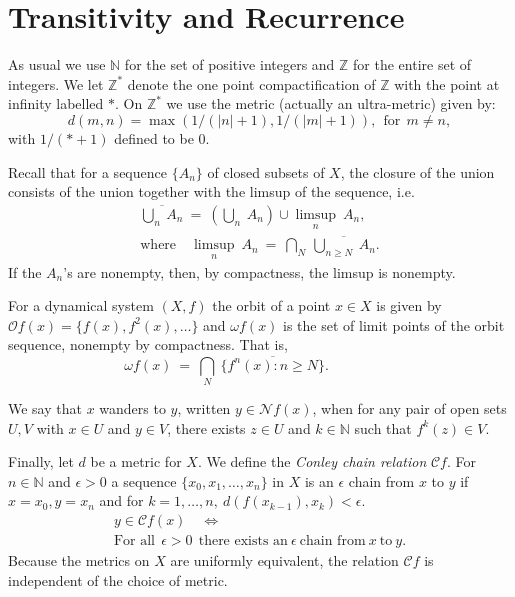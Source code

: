 \documentclass[12pt]{amsart}
\def \ol {\overline}
\def \N {\mathbb N}
\def \Z {\mathbb Z}
\def \CC {\mathcal C}
\def \NN {\mathcal N}
\def \O {\mathcal O}
\def \ep {\epsilon}
\def \om {\omega}
\numberwithin{equation}{section}
\begin{document}
\section{ \textbf{Transitivity and Recurrence}}\vspace{.5cm}

 As usual we use $\N$ for the
set of positive integers and $\Z$ for the entire set of integers. We let  $\Z^*$ denote the
one point compactification of $\Z$ with the point at infinity labelled $*$.  On $\Z^*$ we use the metric (actually an ultra-metric) given by:
\begin{equation}\label{eq1.00}
d(m,n) = \max(1/(|n|+1),1/(|m|+1)),\ \ \text{for} \ \ m \not= n,
\end{equation}
with $1/(* + 1)$ defined to be $0$.


Recall that for a sequence $\{ A_n \}$ of closed subsets of $X$, the closure of the union consists of the union together with the limsup of the sequence, i.e.
\begin{equation}\label{eq1.03}\begin{split}
\ol{\bigcup_n \ A_n} \ = \ (\bigcup_n \ A_n) \cup \limsup_n \ A_n, \\
\text{where} \quad \limsup_n \ A_n \ = \ \bigcap_N \ \ol{\bigcup_{n \ge N} \ A_n}.
\end{split}\end{equation}
If the $A_n$'s are nonempty, then, by compactness, the limsup is nonempty.



For a dynamical system $(X,f)$ the orbit of a point $x \in X$ is given by
 $\O f(x) = \{ f(x), f^2(x), \dots \}$ and $\om f(x)$ is the set of limit points of the orbit sequence, nonempty by compactness. That is,
\begin{equation}\label{eq1.05}
 \om f(x) \ = \ \bigcap_N \ \ol{\{ f^n(x) : n \ge N \}}.\hspace{2cm}
\end{equation}

We  say that $x$ wanders to $y$, written $y \in \NN f(x)$,
 when for any pair of open sets $U, V$ with $x \in U$ and $y \in V$, there exists $z \in U$ and $k \in \N$
such that $f^k(z) \in V$.

Finally, let $d$ be a metric for $X$. We define the \emph{Conley chain relation} $\CC f$.
For $n \in \N$ and $\ep > 0$ a sequence $\{ x_0, x_1, \dots, x_n \}$ in $X$ is an $\ep$ chain from $x$ to $y$ if
$x = x_0, y = x_n$ and for $k = 1, \dots, n, \ d(f(x_{k-1}), x_k) < \ep$.
\begin{equation}\label{eq1.07}\begin{split}
y \in  \CC f(x) \quad \Longleftrightarrow \hspace{3cm} \\
 \text{For all} \ \ \ep > 0 \ \ \text{there exists an} \ \ep \ \text{chain from} \ x \ \text{to} \ y.
\end{split}\end{equation}
Because the metrics on $X$ are uniformly equivalent, the relation $\CC f$ is independent of the choice of metric.
\end{document}

